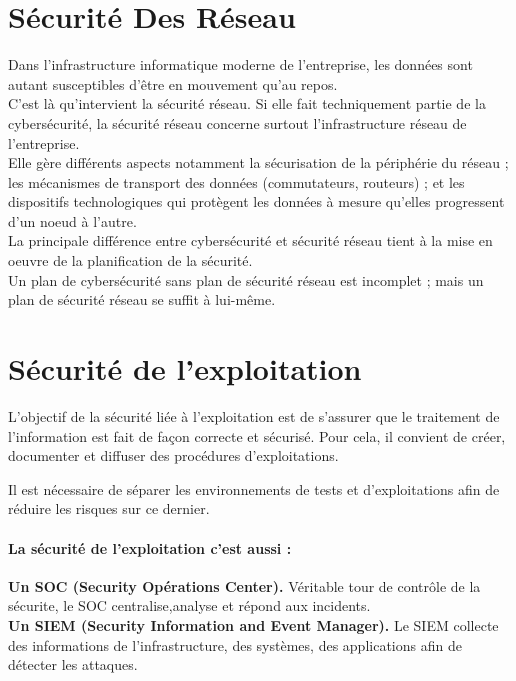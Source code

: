  \section*{Sécurité Des Réseau}
 Dans l'infrastructure informatique moderne de l'entreprise, les données sont autant susceptibles d'être en mouvement qu'au repos.\\
  C'est là qu'intervient la sécurité réseau. Si elle fait techniquement partie de la cybersécurité, la sécurité réseau concerne surtout l'infrastructure réseau de l'entreprise.\\
   Elle gère différents aspects notamment la sécurisation de la périphérie du réseau ; les mécanismes de transport des données (commutateurs, routeurs) ; et les dispositifs technologiques qui protègent les données à mesure qu'elles progressent d'un noeud à l'autre.\\
    La principale différence entre cybersécurité et sécurité réseau tient à la mise en oeuvre de la planification de la sécurité.\\
    Un plan de cybersécurité sans plan de sécurité réseau est incomplet ; mais un plan de sécurité réseau se suffit à lui-même.\\
 
 \section*{Sécurité de l'exploitation}
 
 L’objectif de la sécurité liée à l’exploitation est de s’assurer que le traitement de l’information est fait de façon correcte et sécurisé. Pour cela, il convient de créer, documenter et diffuser des procédures d’exploitations.
 
 Il est nécessaire de séparer les environnements de tests et d’exploitations afin de réduire les risques sur ce dernier.
 
 \paragraph{La sécurité de l’exploitation c’est aussi :\\}
 \textbf{Un SOC (Security Opérations Center).} Véritable tour de contrôle de la sécurite, le SOC centralise,analyse et répond aux incidents.\\
 
 \textbf{Un SIEM (Security Information and Event Manager).} Le SIEM collecte des informations de l’infrastructure, des systèmes, des applications afin de détecter les attaques.\\
 
